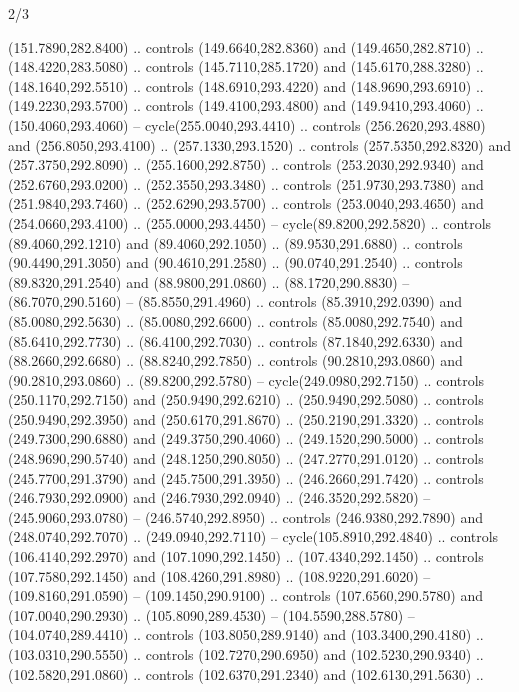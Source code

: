 \begin{flagdescription}{2/3}
\begin{scope}[xshift=0.5\flaglength,yshift=0.5\flagwidth,scale=\stretchfactor]
\begin{scope}[scale=0.001645\flagwidth,yshift=65mm,xshift=-63mm]
\begin{scope}[y=0.80pt, x=0.80pt, yscale=-1,]
\begin{scope}[cm={{1.33333,0.0,0.0,1.33333,(0.0,1e-05)}}]
  (151.7890,282.8400) .. controls (149.6640,282.8360) and (149.4650,282.8710) ..
  (148.4220,283.5080) .. controls (145.7110,285.1720) and (145.6170,288.3280) ..
  (148.1640,292.5510) .. controls (148.6910,293.4220) and (148.9690,293.6910) ..
  (149.2230,293.5700) .. controls (149.4100,293.4800) and (149.9410,293.4060) ..
  (150.4060,293.4060) -- cycle(255.0040,293.4410) .. controls
  (256.2620,293.4880) and (256.8050,293.4100) .. (257.1330,293.1520) .. controls
  (257.5350,292.8320) and (257.3750,292.8090) .. (255.1600,292.8750) .. controls
  (253.2030,292.9340) and (252.6760,293.0200) .. (252.3550,293.3480) .. controls
  (251.9730,293.7380) and (251.9840,293.7460) .. (252.6290,293.5700) .. controls
  (253.0040,293.4650) and (254.0660,293.4100) .. (255.0000,293.4450) --
  cycle(89.8200,292.5820) .. controls (89.4060,292.1210) and (89.4060,292.1050)
  .. (89.9530,291.6880) .. controls (90.4490,291.3050) and (90.4610,291.2580) ..
  (90.0740,291.2540) .. controls (89.8320,291.2540) and (88.9800,291.0860) ..
  (88.1720,290.8830) -- (86.7070,290.5160) -- (85.8550,291.4960) .. controls
  (85.3910,292.0390) and (85.0080,292.5630) .. (85.0080,292.6600) .. controls
  (85.0080,292.7540) and (85.6410,292.7730) .. (86.4100,292.7030) .. controls
  (87.1840,292.6330) and (88.2660,292.6680) .. (88.8240,292.7850) .. controls
  (90.2810,293.0860) and (90.2810,293.0860) .. (89.8200,292.5780) --
  cycle(249.0980,292.7150) .. controls (250.1170,292.7150) and
  (250.9490,292.6210) .. (250.9490,292.5080) .. controls (250.9490,292.3950) and
  (250.6170,291.8670) .. (250.2190,291.3320) .. controls (249.7300,290.6880) and
  (249.3750,290.4060) .. (249.1520,290.5000) .. controls (248.9690,290.5740) and
  (248.1250,290.8050) .. (247.2770,291.0120) .. controls (245.7700,291.3790) and
  (245.7500,291.3950) .. (246.2660,291.7420) .. controls (246.7930,292.0900) and
  (246.7930,292.0940) .. (246.3520,292.5820) -- (245.9060,293.0780) --
  (246.5740,292.8950) .. controls (246.9380,292.7890) and (248.0740,292.7070) ..
  (249.0940,292.7110) -- cycle(105.8910,292.4840) .. controls
  (106.4140,292.2970) and (107.1090,292.1450) .. (107.4340,292.1450) .. controls
  (107.7580,292.1450) and (108.4260,291.8980) .. (108.9220,291.6020) --
  (109.8160,291.0590) -- (109.1450,290.9100) .. controls (107.6560,290.5780) and
  (107.0040,290.2930) .. (105.8090,289.4530) -- (104.5590,288.5780) --
  (104.0740,289.4410) .. controls (103.8050,289.9140) and (103.3400,290.4180) ..
  (103.0310,290.5550) .. controls (102.7270,290.6950) and (102.5230,290.9340) ..
  (102.5820,291.0860) .. controls (102.6370,291.2340) and (102.6130,291.5630) ..

\end{scope}
\end{scope}
\end{scope}
\end{scope}
\end{flagdescription}
